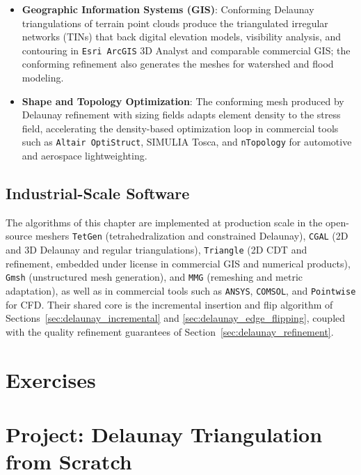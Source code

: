 \begin{itemize}
\item \textbf{Geographic Information Systems (GIS)}: Conforming Delaunay
  triangulations of terrain point clouds produce the triangulated irregular
  networks (TINs) that back digital elevation models, visibility analysis,
  and contouring in \texttt{Esri ArcGIS} 3D Analyst and comparable
  commercial GIS; the conforming refinement also generates the meshes for
  watershed and flood modeling.

\item \textbf{Shape and Topology Optimization}: The conforming mesh produced
  by Delaunay refinement with sizing fields adapts element density to the
  stress field, accelerating the density-based optimization loop in
  commercial tools such as \texttt{Altair OptiStruct}, SIMULIA Tosca, and
  \texttt{nTopology} for automotive and aerospace lightweighting.
\end{itemize}

\subsection{Industrial-Scale Software}
The algorithms of this chapter are implemented at production scale in the
open-source meshers \texttt{TetGen} (tetrahedralization and constrained
Delaunay), \texttt{CGAL} (2D and 3D Delaunay and regular triangulations),
\texttt{Triangle} (2D CDT and refinement, embedded under license in
commercial GIS and numerical products), \texttt{Gmsh} (unstructured mesh
generation), and \texttt{MMG} (remeshing and metric adaptation), as well as
in commercial tools such as \texttt{ANSYS}, \texttt{COMSOL}, and
\texttt{Pointwise} for CFD. Their shared core is the incremental insertion and
flip algorithm of Sections~\ref{sec:delaunay_incremental} and
\ref{sec:delaunay_edge_flipping}, coupled with the quality refinement
guarantees of Section~\ref{sec:delaunay_refinement}.

\section{Exercises}
\label{sec:delaunay_exercises}

\section{Project: Delaunay Triangulation from Scratch}
\label{sec:delaunay_project}

